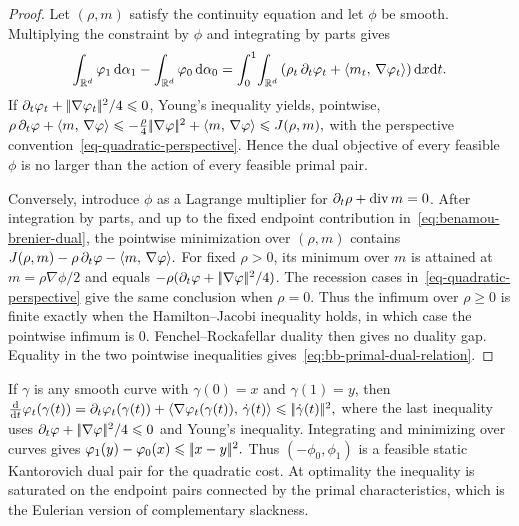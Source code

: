 \begin{proof}
Let $(\rho,m)$ satisfy the continuity equation and let $\phi$ be smooth. Multiplying the constraint by $\phi$ and integrating by parts gives
\[
\int_{\mathbb{R}^d}\varphi_1\,\mathrm{d}\alpha_1
-
\int_{\mathbb{R}^d}\varphi_0\,\mathrm{d}\alpha_0
=
\int_0^1\!\int_{\mathbb{R}^d}
\left(\rho_t\,\partial_t\varphi_t+\langle m_t,\,\nabla\varphi_t\rangle\right)\mathrm{d} x\mathrm{d} t.
\]
If $\partial_t\varphi_t+|\!| \nabla\varphi_t |\!|^2/4\leqslant0$, Young's inequality yields, pointwise, \(\rho\,\partial_t\varphi+\langle m,\,\nabla\varphi\rangle \leqslant -\frac{\rho}{4}|\!| \nabla\varphi |\!|^2+\langle m,\,\nabla\varphi\rangle \leqslant J(\rho,m),\)
with the perspective convention~\eqref{eq-quadratic-perspective}. Hence the dual objective of every feasible $\phi$ is no larger than the action of every feasible primal pair.

Conversely, introduce $\phi$ as a Lagrange multiplier for $\partial_t\rho+\operatorname{div} m=0$. After integration by parts, and up to the fixed endpoint contribution in~\eqref{eq:benamou-brenier-dual}, the pointwise minimization over $(\rho,m)$ contains
\(J(\rho,m)-\rho\,\partial_t\varphi-\langle m,\,\nabla\varphi\rangle.\)
For fixed $\rho>0$, its minimum over $m$ is attained at $m=\rho\nabla\phi/2$ and equals $-\rho(\partial_t\varphi+|\!| \nabla\varphi |\!|^2/4)$. The recession cases in~\eqref{eq-quadratic-perspective} give the same conclusion when \(\rho=0\). Thus the infimum over $\rho\geq0$ is finite exactly when the Hamilton--Jacobi inequality holds, in which case the pointwise infimum is $0$. Fenchel--Rockafellar duality then gives no duality gap. Equality in the two pointwise inequalities gives~\eqref{eq:bb-primal-dual-relation}.
\end{proof}
If $\gamma$ is any smooth curve with $\gamma(0)=x$ and $\gamma(1)=y$, then
\(\frac{\mathrm{d}}{\mathrm{d} t}\varphi_t(\gamma(t)) = \partial_t\varphi_t(\gamma(t))+\langle \nabla\varphi_t(\gamma(t)),\,\dot\gamma(t)\rangle \leqslant |\!| \dot\gamma(t) |\!|^2,\)
where the last inequality uses $\partial_t\varphi+|\!| \nabla\varphi |\!|^2/4\leqslant0$ and Young's inequality. Integrating and minimizing over curves gives \(\varphi_1(y)-\varphi_0(x)\leqslant|\!| x-y |\!|^2.\)
Thus $(-\phi_0,\phi_1)$ is a feasible static Kantorovich dual pair for the quadratic cost. At optimality the inequality is saturated on the endpoint pairs connected by the primal characteristics, which is the Eulerian version of complementary slackness.


